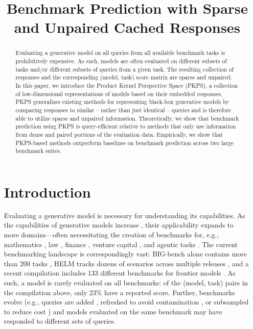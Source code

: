 \documentclass{article}
\title{Benchmark Prediction with Sparse and Unpaired Cached Responses}
\theoremstyle{definition}
\theoremstyle{plain}
\newcommand{\PKPS}{PKPS\xspace}
\begin{document}
\maketitle
{}

\begin{abstract}
Evaluating a generative model on all queries from all available benchmark tasks is
prohibitively expensive. As such, models are often evaluated on different subsets of tasks
and/or different subsets of queries from a given task. The resulting collection of
responses and the corresponding (model, task) score matrix are sparse and unpaired. In
this paper, we introduce the Product Kernel Perspective Space (\PKPS), a collection of
low-dimensional representations of models based on their embedded responses. \PKPS
generalizes existing methods for representing black-box generative models by comparing responses to similar -- rather than just
identical -- queries and is therefore able to utilize sparse and unpaired information. Theoretically, we show that
benchmark prediction using \PKPS is query-efficient relative to methods that only use information from dense and paired portions of the evaluation data. 
Empirically, we show that \PKPS-based methods
outperform baselines on benchmark prediction across two large benchmark suites.
\end{abstract}

\section{Introduction}
\label{sec:introduction}
Evaluating a generative model is necessary for understanding its capabilities.
As the capabilities of generative models increase \citep{wei2022emergent, bubeck2023sparks},
their applicability expands to more domains---often necessitating the creation of benchmarks for, e.g., mathematics \citep{hendrycks2021math}, law
\citep{guha2023legalbench}, finance \citep{islam2023financebench}, venture capital
\citep{chen2025vcbench}, and agentic tasks \citep{liu2023agentbench}.
The current benchmarking landscape is correspondingly vast: BIG-bench alone contains
more than 200 tasks \citep{srivastava2023beyond}, HELM tracks dozens of scenarios
across multiple releases \citep{helm}, and a recent compilation includes 133 different
benchmarks for frontier models \citep{benchpress}.
As such, a model is rarely evaluated on all benchmarks: of the (model, task) pairs in
the compilation above, only 23\% have a reported score.
Further, benchmarks evolve (e.g., queries are added \citep{chollet2025arcagi2}, refreshed to avoid contamination
\citep{white2024livebench}, or subsampled to reduce cost
\citep{perlitz2024efficient}) and models evaluated on the same benchmark may have responded to different sets of queries.
\end{document}
